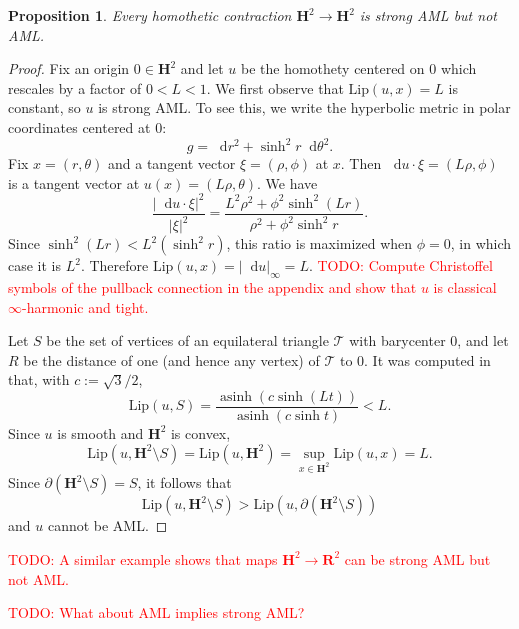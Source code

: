 \documentclass[reqno,11pt]{amsart}
\newcommand{\RR}{\mathbf{R}}
\newcommand{\Hyp}{\mathbf H}
\newcommand*\dif{\mathop{}\!\mathrm{d}}
\DeclareMathOperator{\asinh}{asinh}
\newcommand{\Lip}{\mathrm{Lip}}
\newtheorem{proposition}[theorem]{Proposition}
\theoremstyle{definition}
\numberwithin{equation}{section}
\newcommand\todo[1]{\textcolor{red}{TODO: #1}}
\begin{document}
\begin{proposition}\label{strong AML does not imply AML}
Every homothetic contraction $\Hyp^2 \to \Hyp^2$ is strong AML but not AML.
\end{proposition}
\begin{proof}
Fix an origin $0 \in \Hyp^2$ and let $u$ be the homothety centered on $0$ which rescales by a factor of $0 < L < 1$.
We first observe that $\Lip(u, x) = L$ is constant, so $u$ is strong AML.
To see this, we write the hyperbolic metric in polar coordinates centered at $0$:
$$g = \dif r^2 + \sinh^2 r \dif \theta^2.$$
Fix $x = (r, \theta)$ and a tangent vector $\xi = (\rho, \phi)$ at $x$.
Then $\dif u \cdot \xi = (L\rho, \phi)$ is a tangent vector at $u(x) = (L\rho, \theta)$.
We have 
$$\frac{|\dif u \cdot \xi|^2}{|\xi|^2} = \frac{L^2 \rho^2 + \phi^2 \sinh^2(Lr)}{\rho^2 + \phi^2 \sinh^2 r}.$$
Since $\sinh^2 (Lr) < L^2 (\sinh^2 r)$, this ratio is maximized when $\phi = 0$, in which case it is $L^2$.
Therefore $\Lip(u, x) = |\dif u|_\infty = L$.
\todo{Compute Christoffel symbols of the pullback connection in the appendix and show that $u$ is classical $\infty$-harmonic and tight.}

Let $S$ be the set of vertices of an equilateral triangle $\mathcal T$ with barycenter $0$, and let $R$ be the distance of one (and hence any vertex) of $\mathcal T$ to $0$.
It was computed in \cite[Example 9.6]{Gueritaud17} that, with $c := \sqrt 3/2$,
$$\Lip(u, S) = \frac{\asinh(c \sinh (Lt))}{\asinh(c \sinh t)} < L.$$
Since $u$ is smooth and $\Hyp^2$ is convex,
$$\Lip(u, \Hyp^2 \setminus S) = \Lip(u, \Hyp^2) = \sup_{x \in \Hyp^2} \Lip(u, x) = L.$$
Since $\partial(\Hyp^2 \setminus S) = S$, it follows that
$$\Lip(u, \Hyp^2 \setminus S) > \Lip(u, \partial(\Hyp^2 \setminus S))$$
and $u$ cannot be AML.
\end{proof}

\todo{A similar example shows that maps $\Hyp^2 \to \RR^2$ can be strong AML but not AML.}

\todo{What about AML implies strong AML?}
\end{document}
